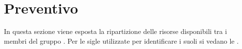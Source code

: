 \section{Preventivo}
In questa sezione viene esposta la ripartizione delle risorse disponibili tra i membri del gruppo \Gruppo{}. Per le sigle utilizzate per identificare i suoli si vedano le \NdPv{}.

\newpage

\newpage

\newpage

\newpage
